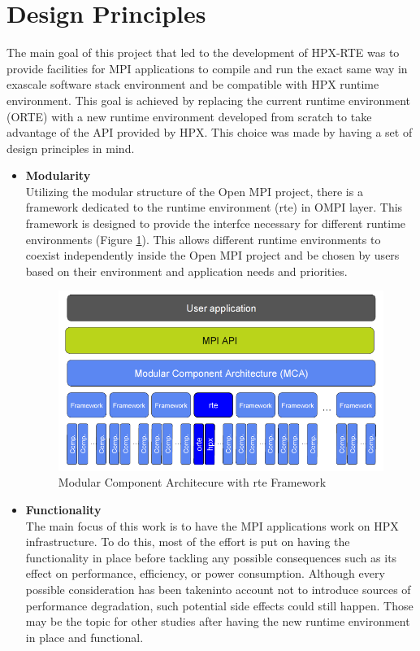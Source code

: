 \section{Design Principles}
\label{sec:design}

The main goal of this project that led to the development of HPX-RTE was to provide facilities for MPI applications to compile and run the exact same way in exascale software stack environment and be compatible with HPX runtime environment. This goal is achieved by replacing the current runtime environment (ORTE) with a new runtime environment developed from scratch to take advantage of the API provided by HPX. This choice was made by having a set of design principles in mind.

\begin{itemize}
\item \textbf{Modularity}\\
  Utilizing the modular structure of the Open MPI project, there is a framework dedicated to the runtime environment (rte) in OMPI layer. This framework is designed to provide the interfce necessary for different runtime environments (Figure \ref{fig:MCA-hpx-rte}). This allows different runtime environments to coexist independently inside the Open MPI project and be chosen by users based on their environment and application needs and priorities.

\begin{figure}[ht]
\centering
\includegraphics[scale=0.5]{images/MCA-hpx-rte.png}
\caption[Modular Component Architecure with rte Framework]{Modular Component Architecure with rte Framework}
\label{fig:MCA-hpx-rte}
\end{figure}
  
\item \textbf{Functionality}\\
  The main focus of this work is to have the MPI applications work on HPX infrastructure. To do this, most of the effort is put on having the functionality in place before tackling any possible consequences such as its effect on performance, efficiency, or power consumption. Although every possible consideration has been takeninto account not to introduce sources of performance degradation, such potential side effects could still happen. Those may be the topic for other studies after having the new runtime environment in place and functional.
  

\end{itemize}
